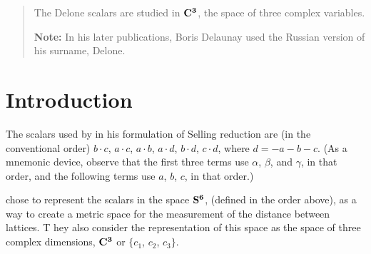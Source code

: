 \documentclass[]{iucr}              %
\numberwithin{equation}{section}
\newcommand{\SVI}[0]{$\bf{S^{6}}$}
\newcommand{\CIII}[0]{$\bf{C^{3}}$}
\begin{document}
	\newcommand{\ci}[0]{$c_1$}
	\newcommand{\cii}[0]{$c_2$}
	\newcommand{\ciii}[0]{$c_3$}
	
	
	\begin{abstract}
		
		The Delone scalars are studied in \CIII, the space of three complex variables.
		
		{\bf Note:}  In his later publications, Boris Delaunay used the Russian version of his surname, Delone.\\
		
		
	\end{abstract}
	
	
	
	
	
	
	
	\section{Introduction}
	
	The scalars used by  in his formulation of Selling reduction \cite{Selling1874}
	are (in the conventional order) $b \cdot c$, $a \cdot c$, $a \cdot b$, $a \cdot d$, 
	$b \cdot d$, $c \cdot d$, where $d = -a-b-c$. 
	(As a mnemonic device, 
	observe that the first three terms use
	$\alpha$, $\beta$, and $\gamma$, 
	in that order, 
	and the following terms use $a$, $b$, $c$, in that order.)
	
	 chose to 
	represent the scalars in the space \SVI{},
	\Svec{} (defined in the order above), 
	as a way to create a metric space
	for the measurement of the distance between lattices. T
	hey also consider the representation of this space as the
	space of three complex dimensions, \CIII{} or 
	{$\{c_1$}, {$c_2$}, {$c_3\}$}. 	
	
\end{document}
